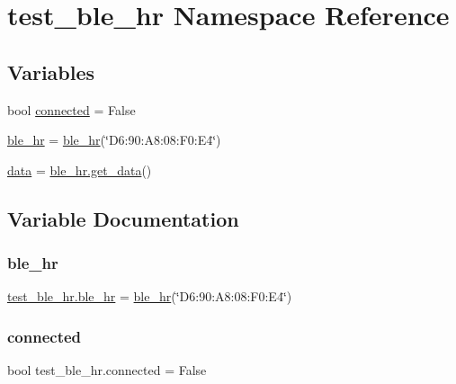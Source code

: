 \hypertarget{namespacetest__ble__hr}{}\section{test\+\_\+ble\+\_\+hr Namespace Reference}
\label{namespacetest__ble__hr}
\subsection*{Variables}
\begin{DoxyCompactItemize}
\item 
bool \hyperlink{namespacetest__ble__hr_a1e71927ff6ae6ecaa71574c382ff6e0c}{connected} = False
\item 
\hyperlink{namespacetest__ble__hr_a5a00d624207b1ba69c313904bd537ec7}{ble\+\_\+hr} = \hyperlink{classble__hr_1_1ble__hr}{ble\+\_\+hr}(\char`\"{}D6\+:90\+:\+A8\+:08\+:\+F0\+:\+E4\char`\"{})
\item 
\hyperlink{namespacetest__ble__hr_ae742ed6744d10574b0d6c1a14097809d}{data} = \hyperlink{classble__hr_1_1ble__hr_a95ed9d67bcd7143ec6b6fd52c03d98dc}{ble\+\_\+hr.\+get\+\_\+data}()
\end{DoxyCompactItemize}


\subsection{Variable Documentation}
\mbox{\label{namespacetest__ble__hr_a5a00d624207b1ba69c313904bd537ec7}} 
\subsubsection{\texorpdfstring{ble\+\_\+hr}{ble\_hr}}
{\footnotesize\ttfamily \hyperlink{classble__hr_1_1ble__hr}{test\+\_\+ble\+\_\+hr.\+ble\+\_\+hr} = \hyperlink{classble__hr_1_1ble__hr}{ble\+\_\+hr}(\char`\"{}D6\+:90\+:\+A8\+:08\+:\+F0\+:\+E4\char`\"{})}

\mbox{\label{namespacetest__ble__hr_a1e71927ff6ae6ecaa71574c382ff6e0c}} 
\subsubsection{\texorpdfstring{connected}{connected}}
{\footnotesize\ttfamily bool test\+\_\+ble\+\_\+hr.\+connected = False}

